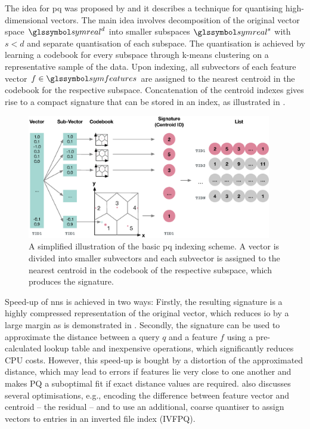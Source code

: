 The idea for \acrshort{pq} was proposed by \cite{Jegou:2010Product} and it describes a technique for quantising high-dimensional vectors. The main idea involves decomposition of the original vector space $\symreal^d$ into smaller subspaces $\symreal^s$ with $s < d$ and separate quantisation of each subspace. The quantisation is achieved by learning a codebook for every subspace through k-means clustering on a representative sample of the data. Upon indexing, all subvectors of each feature vector $f \in \symfeatures$ are assigned to the nearest centroid in the codebook for the respective subspace. Concatenation of the centroid indexes gives rise to a compact signature that can be stored in an index, as illustrated in .

\begin{figure}[tb]
    \centering
    \includegraphics[width=0.95\textwidth]{figures/pq}
    \caption{A simplified illustration of the basic \acrshort{pq} indexing scheme. A vector is divided into smaller subvectors and each subvector is assigned to the nearest centroid in the codebook of the respective subspace, which produces the signature.}
    \label{fig:pq}
\end{figure}

Speed-up of \acrshort{nns} is achieved in two ways: Firstly, the resulting signature is a highly compressed representation of the original vector, which reduces \acrshort{io} by a large margin as is demonstrated in . Secondly, the signature can be used to approximate the distance between a query $q$ and a feature $f$ using a pre-calculated lookup table and inexpensive operations, which significantly reduces CPU costs. However, this speed-up is bought by a distortion of the approximated distance, which may lead to errors if features lie very close to one another and makes PQ a suboptimal fit if exact distance values are required. \cite{Jegou:2010Product} also discusses several optimisations, e.g., encoding the difference between feature vector and centroid -- the residual -- and to use an additional, coarse quantiser to assign vectors to entries in an inverted file index (IVFPQ).

